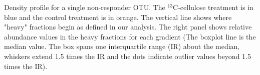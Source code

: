 Density profile for a single non-responder OTU. The $^{13}$C-cellulose treatment is in
blue and the control treatment is in orange. The vertical line shows
where "heavy" fractions begin as defined in our analysis. The right panel
shows relative abundance values in the heavy fractions for each gradient
(The boxplot line is the median value. The box spans one interquartile
range (IR) about the median, whiskers extend 1.5 times the IR and the dots
indicate outlier values beyond 1.5 times the IR).

